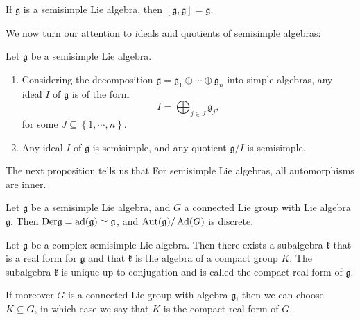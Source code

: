 \documentclass{report}
\begin{document}
\begin{corollary}
    If $\mathfrak g $ is a semisimple Lie algebra, then $[\mathfrak g, \mathfrak g] = \mathfrak g$.
\end{corollary}
We now turn our attention to ideals and quotients of semisimple algebras:
\begin{proposition}
    Let $\mathfrak g$ be a semisimple Lie algebra.
    \begin{enumerate}[label = (\roman*)]
        \item Considering the decomposition $\mathfrak g = \mathfrak g_1 \oplus \cdots \oplus \mathfrak g_n$ into simple algebras, any ideal $I$ of $\mathfrak g$ is of the form
        \[
        I = \bigoplus_{j \in J} \mathfrak g_j,
        \]
        for some $J \subseteq \left\{ 1, \cdots, n \right\}$.
        \item Any ideal $I$ of $\mathfrak g$ is semisimple, and any quotient $\mathfrak g/I$ is semisimple.
    \end{enumerate}
\end{proposition}

The next proposition tells us that For semisimple Lie algebras, all automorphisms are inner.
\begin{proposition}
    Let $\mathfrak g$ be a semisimple Lie algebra, and $G$ a connected Lie group with Lie algebra $\mathfrak g$.
    Then $\mathrm{Der}\mathfrak g = \operatorname{ad}(\mathfrak g) \simeq \mathfrak g$, and $\mathrm{Aut}(\mathfrak g)/\operatorname{Ad}(G)$ is discrete.
\end{proposition}

\begin{theorem}\label{thm:compact_real_form}
    Let $\mathfrak g$ be a complex semisimple Lie algebra.
    Then there exists a subalgebra $\mathfrak k$ that is a real form for $\mathfrak g$ and that $\mathfrak k$ is the algebra of a compact group $K$.
    The subalgebra $\mathfrak k$ is unique up to conjugation and is called the compact real form of $\mathfrak g$.
    
    If moreover $G$ is a connected Lie group with algebra $\mathfrak g$, then we can choose $K\subseteq G$, in which case we say that $K$ is the compact real form of $G$.
\end{theorem}
\end{document}
